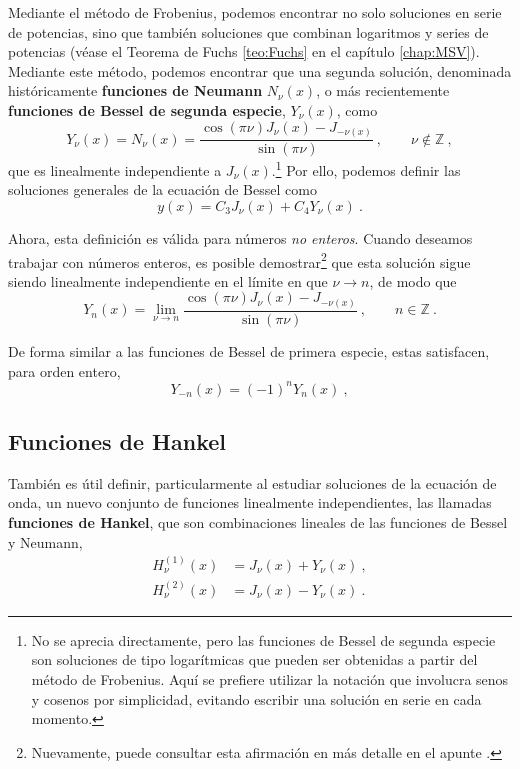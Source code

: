 Mediante el método de Frobenius, podemos encontrar no solo soluciones en serie de potencias, sino que también soluciones que combinan logaritmos y series de potencias (véase el Teorema de Fuchs \ref{teo:Fuchs} en el capítulo \ref{chap:MSV}). Mediante este método, podemos encontrar que una segunda solución, denominada históricamente \textbf{funciones de Neumann} $N_\nu(x)$, o más recientemente \textbf{funciones de Bessel de segunda especie}, $Y_\nu(x)$, como
\begin{equation}
    Y_\nu(x) = N_\nu(x) = \frac{\cos(\pi \nu) J_\nu(x) - J_{-\nu(x)}}{\sin(\pi \nu)} \ , \qquad \nu \notin \mathbb{Z} \ ,
\end{equation}
que es linealmente independiente a $J_\nu(x)$.\footnote{No se aprecia directamente, pero las funciones de Bessel de segunda especie son soluciones de tipo logarítmicas que pueden ser obtenidas a partir del método de Frobenius. Aquí se prefiere utilizar la notación que involucra senos y cosenos por simplicidad, evitando escribir una solución en serie en cada momento.} Por ello, podemos definir las soluciones generales de la ecuación de Bessel como
\begin{equation}
    y(x) = C_3 J_\nu(x) + C_4 Y_\nu(x) \ .
\end{equation}

Ahora, esta definición es válida para números \emph{no enteros}. Cuando deseamos trabajar con números enteros, es posible demostrar\footnote{Nuevamente, puede consultar esta afirmación en más detalle en el apunte \cite{Rubilar}.} que esta solución sigue siendo linealmente independiente en el límite en que $\nu \to n$, de modo que
\begin{equation}
    Y_n(x) = \lim_{\nu \to n} \frac{\cos(\pi \nu) J_\nu(x) - J_{-\nu(x)}}{\sin(\pi \nu)} \ , \qquad n \in \mathbb{Z} \ .
\end{equation}

De forma similar a las funciones de Bessel de primera especie, estas satisfacen, para orden entero, 
\begin{equation}
    Y_{-n}(x) = (-1)^n Y_n(x) \ ,
\end{equation}

\subsection{Funciones de Hankel}

También es útil definir, particularmente al estudiar soluciones de la ecuación de onda,  un nuevo conjunto de funciones linealmente independientes, las llamadas \textbf{funciones de Hankel}, que son combinaciones lineales de las funciones de Bessel y Neumann,
\begin{align}
    H_\nu^{(1)}(x) & = J_\nu(x) + Y_\nu(x) \ , \\
    H_\nu^{(2)}(x) & = J_\nu(x) - Y_\nu(x) \ .
\end{align}

